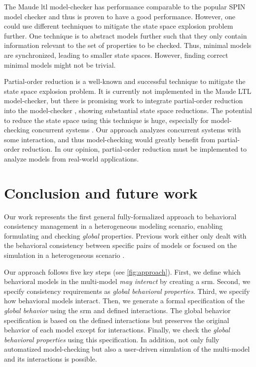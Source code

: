 \documentclass{jot}
\begin{document}
The Maude \gls*{ltl} model-checker has performance comparable to the popular SPIN model checker \cite{ekerMaudeLTLModel2004} and thus is proven to have a good performance.
However, one could use different techniques to mitigate the state space explosion problem further.
One technique is to abstract models further such that they only contain information relevant to the set of properties to be checked.
Thus, minimal models are synchronized, leading to smaller state spaces.
However, finding correct minimal models might not be trivial.

Partial-order reduction is a well-known and successful technique to mitigate the state space explosion problem.
It is currently not implemented in the Maude LTL model-checker, but there is promising work to integrate partial-order reduction into the model-checker \cite{farzanPartialOrderReduction2007}, showing substantial state space reductions.
The potential to reduce the state space using this technique is huge, especially for model-checking concurrent systems \cite{clarkeHandbookModelChecking2018}.
Our approach analyzes concurrent systems with some interaction, and thus model-checking would greatly benefit from partial-order reduction.
In our opinion, partial-order reduction must be implemented to analyze models from real-world applications.


\section{Conclusion and future work} \label{sec:conclusion_and_future_work}
Our work represents the first general fully-formalized approach to behavioral consistency management in a heterogeneous modeling scenario, enabling formulating and checking \emph{global} properties.
Previous work either only dealt with the behavioral consistency between specific pairs of models \cite{yaoConsistencyCheckingUML2006, kusterExplicitBehavioralConsistency2003} or focused on the simulation in a heterogeneous scenario \cite{ekerTamingHeterogeneityPtolemy2003, varalarsenBehavioralCoordinationOperator2015}.

Our approach follows five key steps (see \cref{fig:approach}).
First, we define which behavioral models in the multi-model \emph{may interact} by creating a \gls*{srm}.
Second, we specify consistency requirements as \emph{global behavioral properties}.
Third, we specify how behavioral models interact.
Then, we generate a formal specification of the \emph{global behavior} using the \gls*{srm} and defined interactions.
The global behavior specification is based on the defined interactions but preserves the original behavior of each model except for interactions.
Finally, we check the \emph{global behavioral properties} using this specification.
In addition, not only fully automatized model-checking but also a user-driven simulation of the multi-model and its interactions is possible.
\end{document}
